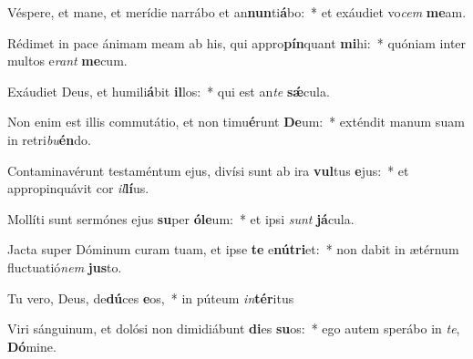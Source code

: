 \item Véspere, et mane, et merídie narrábo et an\textbf{nun}ti\textbf{á}bo:~* et exáudiet vo\textit{cem} \textbf{me}am.
\item Rédimet in pace ánimam meam ab his, qui appro\textbf{pín}quant \textbf{mi}hi:~* quóniam inter multos e\textit{rant} \textbf{me}cum.
\item Exáudiet Deus, et humili\textbf{á}bit \textbf{il}los:~* qui est an\textit{te} \textbf{sǽ}cula.
\item Non enim est illis commutátio, et non timu\textbf{é}runt \textbf{De}um:~* exténdit manum suam in retri\textit{bu}\textbf{én}do.
\item Contaminavérunt testaméntum ejus, divísi sunt ab ira \textbf{vul}tus \textbf{e}jus:~* et appropinquávit cor \textit{il}\textbf{lí}us.
\item Mollíti sunt sermónes ejus \textbf{su}per \textbf{ó}\textbf{le}um:~* et ipsi \textit{sunt} \textbf{já}cula.
\item Jacta super Dóminum curam tuam, et ipse \textbf{te} e\textbf{nú}\textbf{tri}et:~* non dabit in ætérnum fluctuatió\textit{nem} \textbf{jus}to.
\item Tu vero, Deus, de\textbf{dú}ces \textbf{e}os,~* in púteum \textit{in}\textbf{tér}itus
\item Viri sánguinum, et dolósi non dimidiábunt \textbf{di}es \textbf{su}os:~* ego autem sperábo in \textit{te}, \textbf{Dó}mine.

